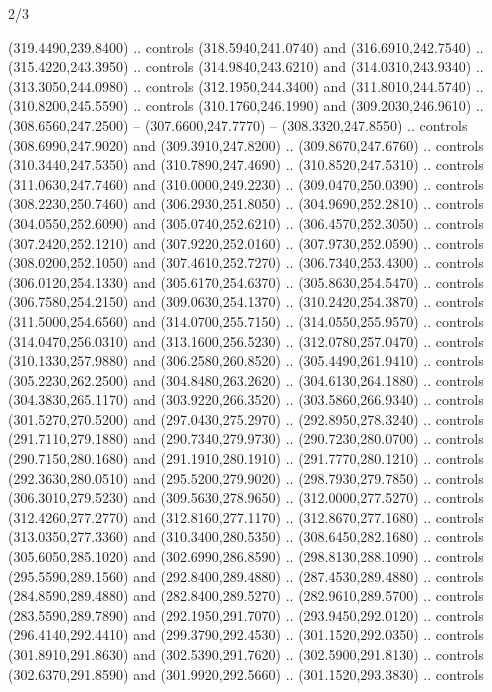 \begin{flagdescription}{2/3}
\begin{scope}[xshift=0.5\flaglength,yshift=0.5\flagwidth,scale=\stretchfactor]
\begin{scope}[scale=0.001645\flagwidth,yshift=65mm,xshift=-63mm]
\begin{scope}[y=0.80pt, x=0.80pt, yscale=-1,]
\begin{scope}[cm={{1.33333,0.0,0.0,1.33333,(0.0,1e-05)}}]
  (319.4490,239.8400) .. controls (318.5940,241.0740) and (316.6910,242.7540) ..
  (315.4220,243.3950) .. controls (314.9840,243.6210) and (314.0310,243.9340) ..
  (313.3050,244.0980) .. controls (312.1950,244.3400) and (311.8010,244.5740) ..
  (310.8200,245.5590) .. controls (310.1760,246.1990) and (309.2030,246.9610) ..
  (308.6560,247.2500) -- (307.6600,247.7770) -- (308.3320,247.8550) .. controls
  (308.6990,247.9020) and (309.3910,247.8200) .. (309.8670,247.6760) .. controls
  (310.3440,247.5350) and (310.7890,247.4690) .. (310.8520,247.5310) .. controls
  (311.0630,247.7460) and (310.0000,249.2230) .. (309.0470,250.0390) .. controls
  (308.2230,250.7460) and (306.2930,251.8050) .. (304.9690,252.2810) .. controls
  (304.0550,252.6090) and (305.0740,252.6210) .. (306.4570,252.3050) .. controls
  (307.2420,252.1210) and (307.9220,252.0160) .. (307.9730,252.0590) .. controls
  (308.0200,252.1050) and (307.4610,252.7270) .. (306.7340,253.4300) .. controls
  (306.0120,254.1330) and (305.6170,254.6370) .. (305.8630,254.5470) .. controls
  (306.7580,254.2150) and (309.0630,254.1370) .. (310.2420,254.3870) .. controls
  (311.5000,254.6560) and (314.0700,255.7150) .. (314.0550,255.9570) .. controls
  (314.0470,256.0310) and (313.1600,256.5230) .. (312.0780,257.0470) .. controls
  (310.1330,257.9880) and (306.2580,260.8520) .. (305.4490,261.9410) .. controls
  (305.2230,262.2500) and (304.8480,263.2620) .. (304.6130,264.1880) .. controls
  (304.3830,265.1170) and (303.9220,266.3520) .. (303.5860,266.9340) .. controls
  (301.5270,270.5200) and (297.0430,275.2970) .. (292.8950,278.3240) .. controls
  (291.7110,279.1880) and (290.7340,279.9730) .. (290.7230,280.0700) .. controls
  (290.7150,280.1680) and (291.1910,280.1910) .. (291.7770,280.1210) .. controls
  (292.3630,280.0510) and (295.5200,279.9020) .. (298.7930,279.7850) .. controls
  (306.3010,279.5230) and (309.5630,278.9650) .. (312.0000,277.5270) .. controls
  (312.4260,277.2770) and (312.8160,277.1170) .. (312.8670,277.1680) .. controls
  (313.0350,277.3360) and (310.3400,280.5350) .. (308.6450,282.1680) .. controls
  (305.6050,285.1020) and (302.6990,286.8590) .. (298.8130,288.1090) .. controls
  (295.5590,289.1560) and (292.8400,289.4880) .. (287.4530,289.4880) .. controls
  (284.8590,289.4880) and (282.8400,289.5270) .. (282.9610,289.5700) .. controls
  (283.5590,289.7890) and (292.1950,291.7070) .. (293.9450,292.0120) .. controls
  (296.4140,292.4410) and (299.3790,292.4530) .. (301.1520,292.0350) .. controls
  (301.8910,291.8630) and (302.5390,291.7620) .. (302.5900,291.8130) .. controls
  (302.6370,291.8590) and (301.9920,292.5660) .. (301.1520,293.3830) .. controls

\end{scope}
\end{scope}
\end{scope}
\end{scope}
\end{flagdescription}

